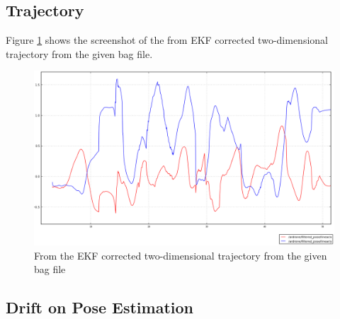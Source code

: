\documentclass[14pt,a4paper]{article}
\begin{document}
		
	\subsection{Trajectory}
		Figure \ref{graph:filtered_pose_corrected} shows the screenshot of the from EKF corrected two-dimensional trajectory from the given bag file.
	
	\begin{figure}[htbp]
	\centering
	\includegraphics[scale=0.4]{filtered_pose_corrected.png}
  	\caption{From the EKF corrected two-dimensional trajectory from the given bag file}
    \label{graph:filtered_pose_corrected}
	\end{figure}
		
	
	\subsection{Drift on Pose Estimation}
	
\end{document}
